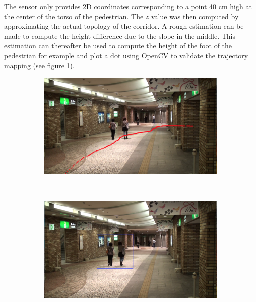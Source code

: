 \documentclass[12pt,a4paper,twoside]{article}
\begin{document}
The sensor only provides 2D coordinates corresponding to a point 40 cm high at the center of the torso of the pedestrian. The $z$ value was then computed by approximating the actual topology of the corridor. A rough estimation can be made to compute the height difference due to the slope in the middle. This estimation can thereafter be used to compute the height of the foot of the pedestrian for example and plot a dot using OpenCV to validate the trajectory mapping (see figure \ref{fig:middle_point_traj}).


\begin{figure}
    \centering
    \begin{subfigure}[b]{0.45\textwidth}
        \includegraphics[width=\textwidth]{images/middle_point_traj}
        \caption{}
        \label{fig:middle_point_traj}
    \end{subfigure}
    ~
    \begin{subfigure}[b]{0.45\textwidth}
        \includegraphics[width=\textwidth]{images/bounding_box}
        \caption{}
        \label{fig:bounding_box}
    \end{subfigure}
    ~
    \begin{subfigure}[b]{0.45\textwidth}

\end{subfigure}
\end{figure}
\end{document}
